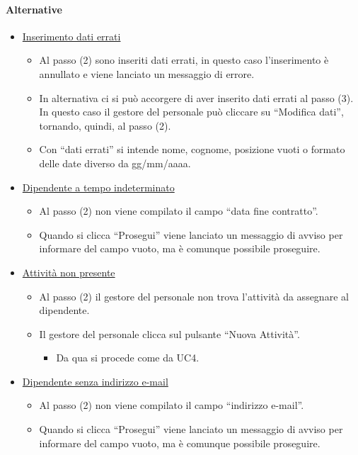 \paragraph{Alternative}
\begin{itemize}
	\item \underline{Inserimento dati errati}
		\begin{itemize}
			\item Al passo (2) sono inseriti dati errati, in questo caso l’inserimento è annullato e viene lanciato un messaggio di errore. 
			\item In alternativa ci si può accorgere di aver inserito dati errati al passo (3). In questo caso il gestore del personale può cliccare su “Modifica dati”, tornando, quindi, al passo (2).
			\item Con “dati errati” si intende nome, cognome, posizione vuoti o formato delle date diverso da gg/mm/aaaa. 
		\end{itemize}
	\item \underline{Dipendente a tempo indeterminato}
		\begin{itemize}
			\item Al passo (2) non viene compilato il campo “data fine contratto”. 
			\item Quando si clicca “Prosegui” viene lanciato un messaggio di avviso per informare del campo vuoto, ma è comunque possibile proseguire. 
		\end{itemize}
	\item \underline{Attività non presente}
		\begin{itemize}
			\item Al passo (2) il gestore del personale non trova l'attività da assegnare al dipendente.
			\item Il gestore del personale clicca sul pulsante “Nuova Attività”.
				\begin{itemize}
					\item Da qua si procede come da UC4.
				\end{itemize}
		\end{itemize}
		\item \underline{Dipendente senza indirizzo e-mail}
		\begin{itemize}
			\item Al passo (2) non viene compilato il campo “indirizzo e-mail”. 
			\item Quando si clicca “Prosegui” viene lanciato un messaggio di avviso per informare del campo vuoto, ma è comunque possibile proseguire. 
		\end{itemize}
\end{itemize}
